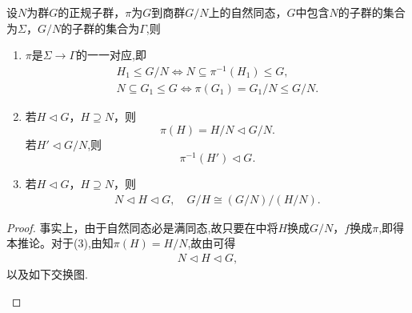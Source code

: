 \documentclass[../../main.tex]{subfiles}%
\begin{document}
\begin{corollary}\label{corollary:群同态第二定理推论}
设$N$为群$G$的正规子群，$\pi$为$G$到商群$G/N$上的自然同态，$G$中包含$N$的子群的集合为$\Sigma$，$G/N$的子群的集合为$\Gamma$,则
\begin{enumerate}[(1)]
\item\label{corollary:群同态第二定理推论-1} $\pi$是$\Sigma \to \Gamma$的一一对应,即
\begin{gather*}
H_1\leqslant G/N\iff N\subseteq \pi^{-1}(H_1) \leqslant G,
\\
N\subseteq G_1\leqslant G \iff \pi(G_1) = G_1/N \leqslant G/N.
\end{gather*}

\item\label{corollary:群同态第二定理推论-2} 若$H \lhd G$，$H \supseteq N$，则$$
\pi(H)=H/N\lhd G/N.
$$
若$H' \lhd G/N$,则
$$
\pi^{-1}(H')\lhd G.
$$

\item\label{corollary:群同态第二定理推论-3} 若$H \lhd G$，$H \supseteq N$，则
\begin{align*}
N\lhd H\lhd G,\quad G/H \cong (G/N)/(H/N). 
\end{align*}
\end{enumerate}
\end{corollary}
\begin{proof}

事实上，由于自然同态必是满同态,故只要在中将$H$换成$G/N$，$f$换成$\pi$,即得本推论。对于(3),由知$\pi (H)=H/N$,故由可得
\begin{align*}
N\lhd H\lhd G,
\end{align*}
以及如下交换图.
\begin{figure}[H]
\centering
{}
\caption{}
\label{figure:抽象代数--图1.7.gq34gaewe2}
\end{figure}
\end{proof}
\end{document}
